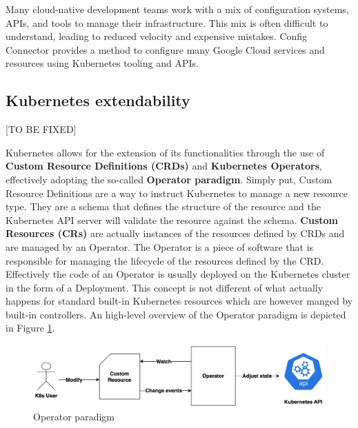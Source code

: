 Many cloud-native development teams work with a mix of configuration systems, APIs, and tools to manage their infrastructure. This mix is often difficult to understand, leading to reduced velocity and expensive mistakes. Config Connector provides a method to configure many Google Cloud services and resources using Kubernetes tooling and APIs.


\subsection{Kubernetes extendability}

[TO BE FIXED]

Kubernetes allows for the extension of its functionalities through the use of \textbf{Custom Resource Definitions (CRDs)} and \textbf{Kubernetes Operators}, effectively adopting the so-called \textbf{Operator paradigm}.
Simply put, Custom Resource Definitions are a way to instruct Kubernetes to manage a new resource type. They are a schema that defines the structure of the resource and the Kubernetes API server will validate the resource against the schema.
\textbf{Custom Resources (CRs)} are actually instances of the resources defined by CRDs and are managed by an Operator.
The Operator is a piece of software that is responsible for managing the lifecycle of the resources defined by the CRD.
Effectively the code of an Operator is usually deployed on the Kubernetes cluster in the form of a Deployment.
This concept is not different of what actually happens for standard built-in Kubernetes resources which are however manged by built-in controllers.
An high-level overview of the Operator paradigm is depicted in Figure \ref{fig:operator_paradigm}.

\begin{figure}[H]
    \centering
    \includegraphics[width=1\linewidth]{images/opeartor_paradigm.png}
    \caption{Operator paradigm}
    \label{fig:operator_paradigm}
\end{figure}


